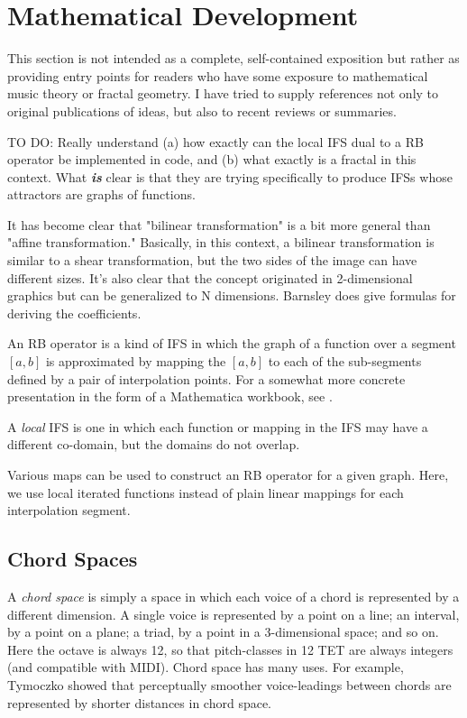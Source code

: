 \documentclass[english,11pt,letterpaper,onecolumn]{scrartcl}
\numberwithin{equation}{section}
\begin{document}
\section{Mathematical Development}

This section is not intended as a complete, self-contained exposition but rather
as providing entry points for readers who have some exposure to mathematical
music theory or fractal geometry. I have tried to supply references not only to
original publications of ideas, but also to recent reviews or summaries.

TO DO: Really understand (a) how exactly can the local IFS dual to a RB operator
be implemented in code, and (b) what exactly is a fractal in this context. What
\textit{\textbf{is}} clear is that they are trying specifically to produce IFSs
whose attractors are graphs of functions.

It has become clear that "bilinear transformation" is a bit more general than
"affine transformation." Basically, in this context, a bilinear transformation
is similar to a shear transformation, but the two sides of the image can have
different sizes. It's also clear that the concept originated in 2-dimensional
graphics but can be generalized to N dimensions. Barnsley does give formulas for
deriving the coefficients.

An RB operator is a kind of IFS in which the graph of a function over a segment
$[a, b]$ is approximated by mapping the $[a, b]$ to each of the sub-segments
defined by a pair of interpolation points. For a somewhat more concrete
presentation in the form of a Mathematica workbook, see \cite{McClure2006}.

A \textit{local} IFS is one in which each function or mapping in the IFS may
have a different co-domain, but the domains do not overlap.

Various maps can be used to construct an RB operator for a given graph. Here, we
use local iterated functions instead of plain linear mappings for each
interpolation segment.

\subsection{Chord Spaces}

A \textit{chord space} is simply a space in which each voice of a chord is
represented by a different dimension. A single voice is represented by a point
on a line; an interval, by a point on a plane; a triad, by a point in a
3-dimensional space; and so on. Here the octave is always 12, so that
pitch-classes in 12 TET are always integers (and compatible with MIDI). Chord
space has many uses. For example, Tymoczko \cite{tymoczko2006geometry,
tymoczko2011geometry} showed that perceptually smoother voice-leadings between
chords are represented by shorter distances in chord space.
\end{document}
